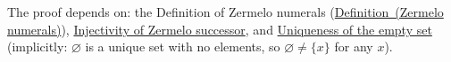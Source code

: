 \begin{remark*}[Dependencies]
The proof depends on: the Definition of Zermelo numerals
(\hyperref[def:zermelo-numerals]{Definition~(Zermelo numerals)}),
\hyperref[prop:zermelo-successor-injective]{Injectivity of Zermelo successor},
and \hyperref[prop:empty-unique]{Uniqueness of the empty set} (implicitly: $\varnothing$ is
a unique set with no elements, so $\varnothing \neq \{x\}$ for any $x$).
\end{remark*}
